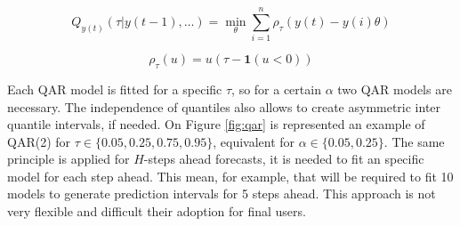 \begin{equation}
Q_{y(t)}(\tau | y(t-1),\ldots) = \min_\theta \sum_{i=1}^n \rho_\tau (y(t) - y(i)\theta)    
\label{eqn:qar}
\end{equation}

\begin{equation}
    \rho_\tau(u) = u(\tau - \mathbf{1}(u < 0))
    \label{eqn:pinball}
\end{equation}

Each QAR model is fitted for a specific $\tau$, so for a certain $\alpha$ two QAR models are necessary. The independence of quantiles  also allows to create asymmetric inter quantile intervals, if needed. On Figure \ref{fig:qar} is represented an example of QAR(2) for $\tau \in \{0.05,0.25,0.75,0.95\}$, equivalent for $\alpha \in \{0.05,0.25\}$.  The same principle is applied for $H$-steps ahead forecasts, it is needed to fit an specific model for each step ahead. This mean, for example, that will be required to fit 10 models to generate prediction intervals for 5 steps ahead. This approach is not very flexible and difficult their adoption for final users.

